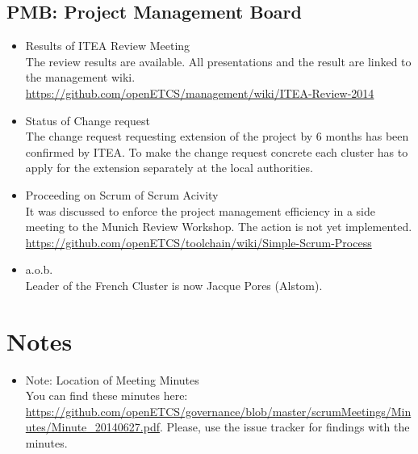 \documentclass[a4paper, 11pt]{article}
\begin{document}
\subsection{PMB: Project Management Board}
\begin{itemize}
\item Results of ITEA Review Meeting\\
The review results are available. All presentations and the result are linked to the management wiki. \url{https://github.com/openETCS/management/wiki/ITEA-Review-2014}

\item Status of Change request\\
The change request requesting extension of the project by 6 months has been confirmed by ITEA. To make the change request concrete each cluster has to apply for the extension separately at the local authorities.

\item Proceeding on Scrum of Scrum Acivity\\
It was discussed to enforce the project management efficiency in a  side meeting to the Munich Review Workshop. The action is not yet implemented. \url{https://github.com/openETCS/toolchain/wiki/Simple-Scrum-Process}

\item a.o.b.\\
Leader of the French Cluster is now Jacque Pores (Alstom).

\end{itemize}

\section{Notes}
\begin{itemize}

\item Note: Location of Meeting Minutes\\
You can find these minutes here: \url{https://github.com/openETCS/governance/blob/master/scrumMeetings/Minutes/Minute_20140627.pdf}. Please, use the issue tracker for findings with the minutes.

\end{itemize}
\end{document}
